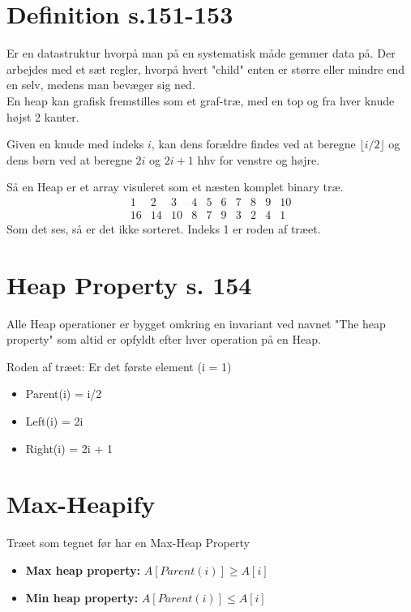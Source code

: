 \documentclass[11pt,a4paper]{report}
\theoremstyle{plain}
\theoremstyle{definition}
\theoremstyle{remark}
\numberwithin{equation}{section}
\begin{document}
\section{Definition s.151-153}
Er en datastruktur hvorpå man på en systematisk måde gemmer data på. Der arbejdes med et sæt regler, hvorpå hvert "child" enten er større eller mindre end en selv, medens man bevæger sig ned.\\
En heap kan grafisk fremstilles som et graf-træ, med en top og fra hver knude højst 2 kanter.

Given en knude med indeks $i$, kan dens forældre findes ved at beregne $\lfloor i/2 \rfloor$ og dens børn ved at beregne $2i$ og $2i+1$ hhv for venstre og højre.

Så en Heap er et array visuleret som et næsten komplet binary træ.
\[
\begin{array}{cccccccccc}
  1 & 2 & 3 & 4 & 5 & 6 & 7 & 8 & 9 & 10 \\
  16 & 14 & 10 & 8 & 7 & 9 & 3 & 2 & 4 & 1
\end{array}
\]
Som det ses, så er det ikke sorteret. Indeks 1 er roden af træet.

\section{Heap Property s. 154}
Alle Heap operationer er bygget omkring en invariant ved navnet "The heap property" som altid er opfyldt efter hver operation på en Heap.

Roden af træet: Er det første element (i = 1)

\begin{itemize}
  \item Parent(i) = i/2
  \item Left(i) = 2i
  \item Right(i) = 2i + 1
\end{itemize}


\section{Max-Heapify}

Træet som tegnet før har en Max-Heap Property

\begin{itemize}
  \item \textbf{Max heap property:} $A[Parent(i)] \geq A[i]$
  \item \textbf{Min heap property:} $A[Parent(i)] \leq A[i]$
\end{itemize}
\end{document}

